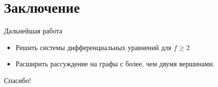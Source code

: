 \documentclass{beamer}
\begin{document}
 \section{Заключение}
 \begin{frame}{Дальнейшая работа}
   \begin{itemize}
    \item Решить системы дифференциальных уравнений для $f \ge 2$
    \item Расширить рассуждение на графы с более, чем двумя вершинами.
   \end{itemize}
 \end{frame}
 
 \begin{frame}
  \begin{center}
   \Huge Спасибо!
  \end{center}

 \end{frame}
\end{document}
